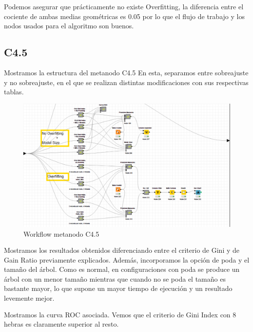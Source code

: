 	Podemos asegurar que prácticamente no existe Overfitting, la diferencia entre el cociente de ambas medias geométricas es 0.05 por lo que el flujo de trabajo y los nodos usados para el algoritmo son buenos.

	\subsection{C4.5}
	
	\hspace{1cm} Mostramos la estructura del metanodo C4.5
	En esta, separamos entre sobreajuste y no sobreajuste, en el que se realizan distintas modificaciones con sus respectivas tablas.
	
	\begin{figure}[H]
		\centering
		\includegraphics[width=1\textwidth]{img/c45comp.png}
		\caption{Workflow metanodo C4.5}
	\end{figure}


	Mostramos los resultados obtenidos diferenciando entre el criterio de Gini y de Gain Ratio previamente explicados. Además, incorporamos la opción de poda y el tamaño del árbol. Como es normal, en configuraciones con poda se produce un árbol con un menor tamaño mientras que cuando no se poda el tamaño es bastante mayor, lo que supone un mayor tiempo de ejecución y un resultado levemente mejor.

	
	Mostramos la curva ROC asociada. Vemos que el criterio de Gini Index con 8 hebras es claramente superior al resto.

